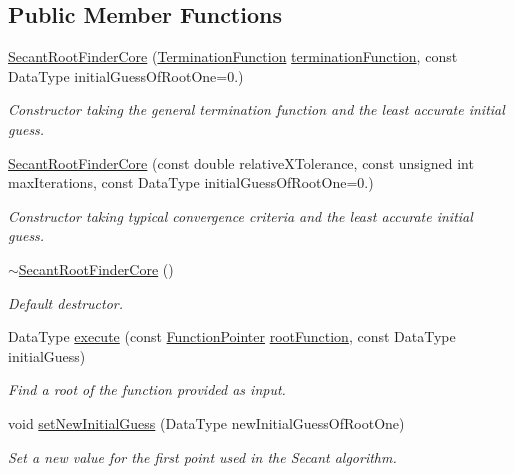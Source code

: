 \subsection*{Public Member Functions}
\begin{DoxyCompactItemize}
\item 
\hyperlink{classtudat_1_1root__finders_1_1SecantRootFinderCore_a33462168eed31273e7f7d0e919911384}{Secant\+Root\+Finder\+Core} (\hyperlink{classtudat_1_1root__finders_1_1RootFinderCore_a8dd4dc4316b5e984e279816e0a2b67d5}{Termination\+Function} \hyperlink{classtudat_1_1root__finders_1_1RootFinderCore_a7a1efe7ce979318d398b4bb8574e70d6}{termination\+Function}, const Data\+Type initial\+Guess\+Of\+Root\+One=0.)
\begin{DoxyCompactList}\small\item\em Constructor taking the general termination function and the least accurate initial guess. \end{DoxyCompactList}\item 
\hyperlink{classtudat_1_1root__finders_1_1SecantRootFinderCore_a868f594de638700d029e7b2d6e4c0ef6}{Secant\+Root\+Finder\+Core} (const double relative\+X\+Tolerance, const unsigned int max\+Iterations, const Data\+Type initial\+Guess\+Of\+Root\+One=0.)
\begin{DoxyCompactList}\small\item\em Constructor taking typical convergence criteria and the least accurate initial guess. \end{DoxyCompactList}\item 
\hyperlink{classtudat_1_1root__finders_1_1SecantRootFinderCore_aa61f73edb9e75c273b342ac3cd2d6efb}{$\sim$\+Secant\+Root\+Finder\+Core} ()\hypertarget{classtudat_1_1root__finders_1_1SecantRootFinderCore_aa61f73edb9e75c273b342ac3cd2d6efb}{}\label{classtudat_1_1root__finders_1_1SecantRootFinderCore_aa61f73edb9e75c273b342ac3cd2d6efb}

\begin{DoxyCompactList}\small\item\em Default destructor. \end{DoxyCompactList}\item 
Data\+Type \hyperlink{classtudat_1_1root__finders_1_1SecantRootFinderCore_a5d08d05f54d43f70cb59aef9cccb86c6}{execute} (const \hyperlink{classtudat_1_1root__finders_1_1RootFinderCore_af0bb889d21fa3bc55785021381d3b4b5}{Function\+Pointer} \hyperlink{classtudat_1_1root__finders_1_1RootFinderCore_afbe57f7fa3baba13128d9dc2ca41dedd}{root\+Function}, const Data\+Type initial\+Guess)
\begin{DoxyCompactList}\small\item\em Find a root of the function provided as input. \end{DoxyCompactList}\item 
void \hyperlink{classtudat_1_1root__finders_1_1SecantRootFinderCore_aba0d44c3dc4823b7772f0c0e5a5deeb4}{set\+New\+Initial\+Guess} (Data\+Type new\+Initial\+Guess\+Of\+Root\+One)
\begin{DoxyCompactList}\small\item\em Set a new value for the first point used in the Secant algorithm. \end{DoxyCompactList}\end{DoxyCompactItemize}
